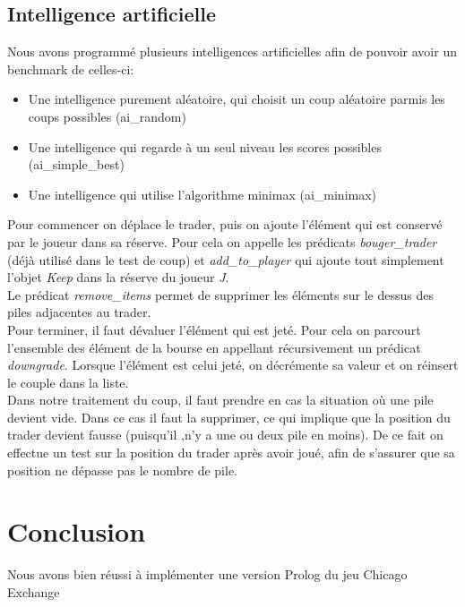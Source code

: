 \documentclass[11pt,a4paper,twoside,french,svgnames]{report}
\begin{document}
\section{Intelligence artificielle}
Nous avons programmé plusieurs intelligences artificielles afin de pouvoir avoir un benchmark de celles-ci:
\begin{itemize}
	\item Une intelligence purement aléatoire, qui choisit un coup aléatoire parmis les coups possibles (ai\_random)
    \item Une intelligence qui regarde à un seul niveau les scores possibles (ai\_simple\_best)
    \item Une intelligence qui utilise l'algorithme minimax (ai\_minimax)
\end{itemize}
Pour commencer on déplace le trader, puis on ajoute l'élément qui est conservé par le joueur dans sa réserve. Pour cela on appelle les prédicats \textit{bouger\_trader} (déjà utilisé dans le test de coup) et \textit{add\_to\_player} qui ajoute tout simplement l'objet \textit{Keep} dans la réserve du joueur \textit{J}. \\
Le prédicat \textit{remove\_items} permet de supprimer les éléments sur le dessus des piles adjacentes au trader.\\
Pour terminer, il faut dévaluer l'élément qui est jeté. Pour cela on parcourt l'ensemble des élément de la bourse en appellant récursivement un prédicat \textit{downgrade}. Lorsque l'élément est celui jeté, on décrémente sa valeur et on réinsert le couple dans la liste.\\
Dans notre traitement du coup, il faut prendre en cas la situation où une pile devient vide. Dans ce cas il faut la supprimer, ce qui implique que la position du trader devient fausse (puisqu'il ,n'y a une ou deux pile en moins). De ce fait on effectue un test sur la position du trader après avoir joué, afin de s'assurer que sa position ne dépasse pas le nombre de pile.

\chapter{Conclusion}
Nous avons bien réussi à implémenter une version Prolog du jeu Chicago Exchange
\end{document}
